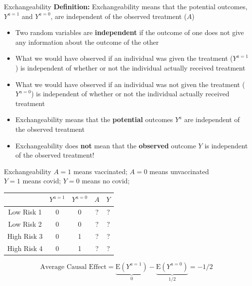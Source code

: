\documentclass{beamer}
\newcommand\E{\text{E}}
\begin{document}
\begin{frame}{Exchangeability}
\textbf{Definition:} Exchangeability means that the potential outcomes, $Y^{a=1}$ and $Y^{a = 0}$, are independent of the observed treatment ($A$)
\pause
\vspace{1em}

{\small 
\begin{itemize}
    \item Two random variables are \textbf{independent} if the outcome of one does not give any information about the outcome of the other
    \pause 
    \item What we would have observed if an individual was given the treatment ($Y^{a = 1}$) is independent of whether or not the individual actually received treatment 
    \item What we would have observed if an individual was not given the treatment ($Y^{a = 0}$) is independent of whether or not the individual actually received treatment  
    \pause 
     \item Exchangeability means that the \textbf{potential} outcomes $Y^a$ are independent of the observed treatment
    \item Exchangeability does \textbf{not} mean that the \textbf{observed} outcome $Y$ is independent of the observed treatment!
\end{itemize}
}


\end{frame}


\begin{frame}{Exchangeability}
$A = 1$ means vaccinated; $A = 0$ means unvaccinated\\
$Y = 1$ means covid; $Y = 0$ means no covid;

\begin{table}
\begin{tabular}[t]{c|c| c|c|c}
\toprule
& $Y^{a=1}$ & $Y^{a=0}$ & $A$ & $Y$\\
\midrule
Low Risk 1 & 0 & 0 & ? & ?\\
Low Risk 2 & 0 & 0 & ? & ?\\
High Risk 3 & 0 & 1 & ? & ?\\
High Risk 4 & 0 & 1 & ? & ?\\
\bottomrule
\end{tabular}
\end{table}


\pause 
\[\text{Average Causal Effect} =\underbrace{\E(Y^{a = 1})}_{0} - \underbrace{\E(Y^{a = 0})}_{1/2} = -1/2 \]
    

\end{frame}
\end{document}
